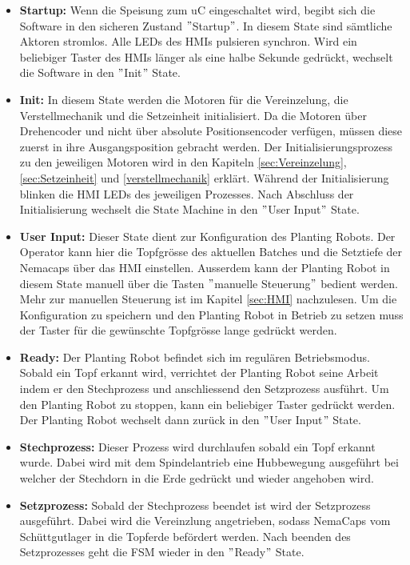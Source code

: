 \begin{itemize}
	\item \textbf{Startup:} Wenn die Speisung zum uC eingeschaltet wird, begibt sich die Software in den sicheren Zustand $"$Startup$"$. In diesem State sind sämtliche Aktoren stromlos. Alle LEDs des HMIs pulsieren synchron. Wird ein beliebiger Taster des HMIs länger als eine halbe Sekunde gedrückt, wechselt die Software in den $"$Init$"$ State.
	\item \textbf{Init:} In diesem State werden die Motoren für die Vereinzelung, die Verstellmechanik und die Setzeinheit initialisiert. Da die Motoren über Drehencoder und nicht über absolute Positionsencoder verfügen, müssen diese zuerst in ihre Ausgangsposition gebracht werden. Der Initialisierungsprozess zu den jeweiligen Motoren wird in den Kapiteln \ref{sec:Vereinzelung}, \ref{sec:Setzeinheit} und \ref{verstellmechanik} erklärt. Während der Initialisierung blinken die HMI LEDs des jeweiligen Prozesses. Nach Abschluss der Initialisierung wechselt die State Machine in den $"$User Input$"$ State.
	\item \textbf{User Input:} Dieser State dient zur Konfiguration des Planting Robots. Der Operator kann hier die Topfgrösse des aktuellen Batches und die Setztiefe der Nemacaps über das HMI einstellen. Ausserdem kann der Planting Robot in diesem State manuell über die Tasten $"$manuelle Steuerung$"$ bedient werden. Mehr zur manuellen Steuerung ist im Kapitel \ref{sec:HMI} nachzulesen. Um die Konfiguration zu speichern und den Planting Robot in Betrieb zu setzen muss der Taster für die gewünschte Topfgrösse lange gedrückt werden.
	\item \textbf{Ready:} Der Planting Robot befindet sich im regulären Betriebsmodus. Sobald ein Topf erkannt wird, verrichtet der Planting Robot seine Arbeit indem er den Stechprozess und anschliessend den Setzprozess ausführt. Um den Planting Robot zu stoppen, kann ein beliebiger Taster gedrückt werden. Der Planting Robot wechselt dann zurück in den $"$User Input$"$ State.
	\item \textbf{Stechprozess:} Dieser Prozess wird durchlaufen sobald ein Topf erkannt wurde. Dabei wird mit dem Spindelantrieb eine Hubbewegung ausgeführt bei welcher der Stechdorn in die Erde gedrückt und wieder angehoben wird.
	\item \textbf{Setzprozess:} Sobald der Stechprozess beendet ist wird der Setzprozess ausgeführt. Dabei wird die Vereinzlung angetrieben, sodass NemaCaps vom Schüttgutlager in die Topferde befördert werden. Nach beenden des Setzprozesses geht die FSM wieder in den $"$Ready$"$ State.
\end{itemize}

